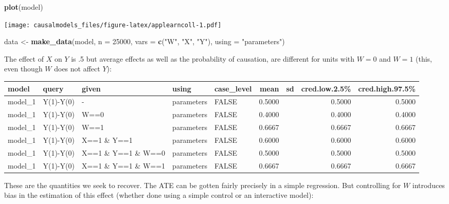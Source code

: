 \documentclass[
  12pt,
]{book}
\newenvironment{Shaded}{\begin{snugshade}}{\end{snugshade}}
\newcommand{\AttributeTok}[1]{\textcolor[rgb]{0.13,0.29,0.53}{#1}}
\newcommand{\DecValTok}[1]{\textcolor[rgb]{0.00,0.00,0.81}{#1}}
\newcommand{\FunctionTok}[1]{\textcolor[rgb]{0.13,0.29,0.53}{\textbf{#1}}}
\newcommand{\NormalTok}[1]{#1}
\newcommand{\OtherTok}[1]{\textcolor[rgb]{0.56,0.35,0.01}{#1}}
\newcommand{\StringTok}[1]{\textcolor[rgb]{0.31,0.60,0.02}{#1}}
\begin{document}
\begin{Shaded}
\begin{Highlighting}[]
\FunctionTok{plot}\NormalTok{(model)}
\end{Highlighting}
\end{Shaded}

\texttt{[image: causalmodels\_files/figure-latex/applearncoll-1.pdf]}

\begin{Shaded}
\begin{Highlighting}[]
\NormalTok{data }\OtherTok{\textless{}{-}} \FunctionTok{make\_data}\NormalTok{(model, }
                  \AttributeTok{n =} \DecValTok{25000}\NormalTok{, }
                  \AttributeTok{vars =} \FunctionTok{c}\NormalTok{(}\StringTok{"W"}\NormalTok{, }\StringTok{"X"}\NormalTok{, }\StringTok{"Y"}\NormalTok{), }
                  \AttributeTok{using =} \StringTok{"parameters"}\NormalTok{)}
\end{Highlighting}
\end{Shaded}

The effect of \(X\) on \(Y\) is .5 but average effects as well as the probability of causation, are different for units with \(W=0\) and \(W=1\) (this, even though \(W\) does not affect \(Y\)):

\begin{tabular}{l|l|l|l|l|r|r|r|r}
\hline
model & query & given & using & case\_level & mean & sd & cred.low.2.5\% & cred.high.97.5\%\\
\hline
model\_1 & Y(1)-Y(0) & - & parameters & FALSE & 0.5000 &  & 0.5000 & 0.5000\\
\hline
model\_1 & Y(1)-Y(0) & W==0 & parameters & FALSE & 0.4000 &  & 0.4000 & 0.4000\\
\hline
model\_1 & Y(1)-Y(0) & W==1 & parameters & FALSE & 0.6667 &  & 0.6667 & 0.6667\\
\hline
model\_1 & Y(1)-Y(0) & X==1 \& Y==1 & parameters & FALSE & 0.6000 &  & 0.6000 & 0.6000\\
\hline
model\_1 & Y(1)-Y(0) & X==1 \& Y==1 \& W==0 & parameters & FALSE & 0.5000 &  & 0.5000 & 0.5000\\
\hline
model\_1 & Y(1)-Y(0) & X==1 \& Y==1 \& W==1 & parameters & FALSE & 0.6667 &  & 0.6667 & 0.6667\\
\hline
\end{tabular}

These are the quantities we seek to recover. The ATE can be gotten fairly precisely in a simple regression. But controlling for \(W\) introduces bias in the estimation of this effect (whether done using a simple control or an interactive model):
\end{document}
